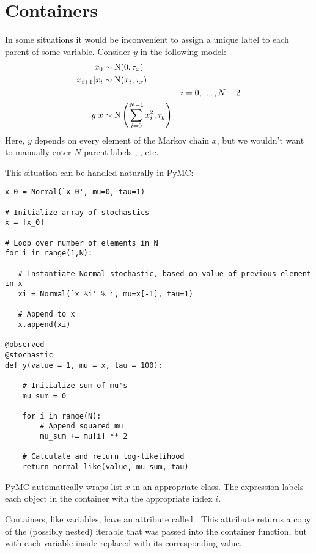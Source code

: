\hypertarget{container}{}
\section*{Containers} \label{container}

In some situations it would be inconvenient to assign a unique label to each parent of some variable. Consider $y$ in the following model:
\begin{align*}
    x_0 &\sim \textup N (0,\tau_x)\\
    x_{i+1}|x_i &\sim \textup{N}(x_i, \tau_x)\\
    &&i=0,\ldots, N-2\\
    y|x &\sim \textup N \left(\sum_{i=0}^{N-1}x_i^2,\tau_y\right)
\end{align*}
Here, $y$ depends on every element of the Markov chain $x$, but we wouldn't want to manually enter $N$ parent labels , , etc.

This situation can be handled naturally in PyMC:
\begin{verbatim}
x_0 = Normal(`x_0', mu=0, tau=1)

# Initialize array of stochastics
x = [x_0]

# Loop over number of elements in N
for i in range(1,N):  
      
   # Instantiate Normal stochastic, based on value of previous element in x
   xi = Normal(`x_%i' % i, mu=x[-1], tau=1)    
 
   # Append to x
   x.append(xi)

@observed
@stochastic
def y(value = 1, mu = x, tau = 100):

    # Initialize sum of mu's
    mu_sum = 0

    for i in range(N):
        # Append squared mu
        mu_sum += mu[i] ** 2

    # Calculate and return log-likelihood
    return normal_like(value, mu_sum, tau)
\end{verbatim}
PyMC automatically wraps list $x$ in an appropriate  class. The  expression  labels each  object in the container with the appropriate index $i$.

Containers, like variables, have an attribute called . This attribute returns a copy of the (possibly nested) iterable that was passed into the container function, but with each variable inside replaced with its corresponding value. 

